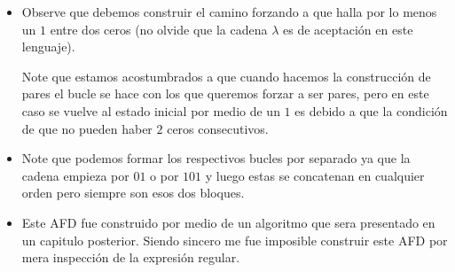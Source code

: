 \begin{itemize}[label={✎}]
        \item Observe que debemos construir el camino forzando a que halla por lo menos un $1$ entre dos ceros (no olvide que la cadena $\lambda$ es de aceptación en este lenguaje).
        \begin{basedtikz}
        \end{basedtikz}
        Note que estamos acostumbrados a que cuando hacemos la construcción de pares el bucle se hace con los que queremos forzar a ser pares, pero en este caso se vuelve al estado inicial por medio de un $1$ es debido a que la condición de que no pueden haber $2$ ceros consecutivos.
        \item Note que podemos formar los respectivos bucles por separado ya que la cadena empieza por $01$ o por $101$ y luego estas se concatenan en cualquier  orden pero siempre son esos dos bloques.
        \begin{basedtikz}
        \end{basedtikz}
        \item Este AFD fue construido por medio de un algoritmo que sera presentado en un capitulo posterior. Siendo sincero me fue imposible construir este AFD por mera inspección de la expresión regular.

\end{itemize}

